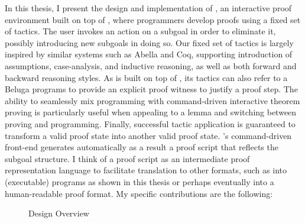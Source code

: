 In this thesis, I present the design and implementation of \Harpoon, an
interactive proof environment built on top of \Beluga, where programmers develop
proofs using a fixed set of tactics.
The user invokes an action on a subgoal in order to eliminate it, possibly
introducing new subgoals in doing so.
Our fixed set of tactics is largely inspired by similar systems such as
Abella \cite{Gacek:IJCAR08} and Coq, supporting introduction of assumptions,
case-analysis, and inductive reasoning, as well as both forward and backward
reasoning styles.
As \Harpoon{} is built on top of \Beluga{}, its tactics can also refer to a
Beluga{} programs to provide an explicit proof witness to justify a proof step.
The ability to seamlessly mix programming with command-driven interactive
theorem proving is particularly useful when appealing to a lemma and switching
between proving and programming.
Finally, successful tactic application is guaranteed to transform a valid proof
state into another valid proof state.
%
\Harpoon's command-driven front-end generates automatically as a result a proof
script that reflects the subgoal structure.
I think of a proof script as an intermediate proof representation language to
facilitate translation to other formats, such as into (executable) \Beluga{}
programs as shown in this thesis or perhaps eventually into a human-readable
proof format. My specific contributions are the following:

\begin{figure}[t]
  \centering
  
  \caption{\Harpoon{} Design Overview}
  \label{fig:harpoon}
\end{figure}

